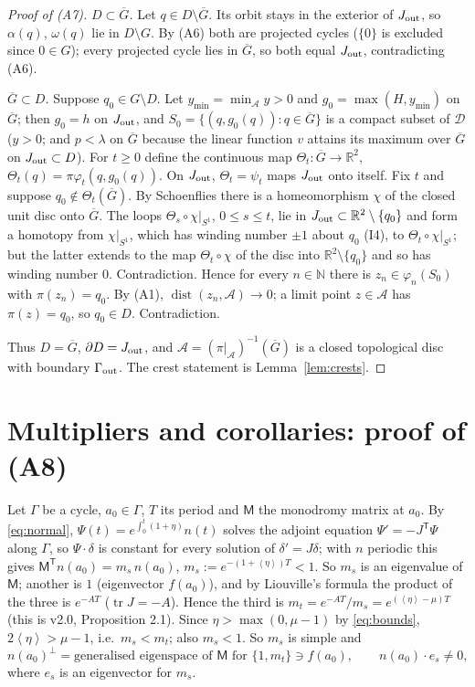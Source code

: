 \documentclass[11pt,a4paper]{article}
\numberwithin{equation}{section}
\theoremstyle{remark}\newtheorem{remark}[theorem]{Remark}
\newcommand{\R}{\mathbb R}
\newcommand{\cA}{\mathcal A}
\newcommand{\cD}{\mathcal D}
\newcommand{\avg}[1]{\left\langle #1\right\rangle}
\begin{document}
\begin{proof}[Proof of (A7)]
\emph{$D\subset\overline G$.} Let $q\in D\setminus\overline G$. Its orbit stays in the exterior of $J_{\rm out}$, so
$\alpha(q)$, $\omega(q)$ lie in $D\setminus G$. By (A6) both are projected cycles ($\{0\}$ is excluded since
$0\in G$); every projected cycle lies in $\overline G$, so both equal $J_{\rm out}$, contradicting (A6).

\emph{$\overline G\subset D$.} Suppose $q_0\in G\setminus D$. Let $y_{\min}=\min_\cA y>0$ and
$g_0=\max(H,y_{\min})$ on $\overline G$; then $g_0=h$ on $J_{\rm out}$, and
$S_0=\{(q,g_0(q)):q\in\overline G\}$ is a compact subset of $\cD$ ($y>0$; and $p<\lambda$ on $\overline G$ because
the linear function $v$ attains its maximum over $\overline G$ on $J_{\rm out}\subset D$). For $t\ge0$ define the
continuous map $\Theta_t:\overline G\to\R^2$, $\Theta_t(q)=\pi\varphi_t(q,g_0(q))$. On $J_{\rm out}$,
$\Theta_t=\psi_t$ maps $J_{\rm out}$ onto itself. Fix $t$ and suppose $q_0\notin\Theta_t(\overline G)$. By
Schoenflies there is a homeomorphism $\chi$ of the closed unit disc onto $\overline G$. The loops
$\Theta_s\circ\chi|_{S^1}$, $0\le s\le t$, lie in $J_{\rm out}\subset\R^2\setminus\{q_0\}$ and form a homotopy from
$\chi|_{S^1}$, which has winding number $\pm1$ about $q_0$ (I4), to $\Theta_t\circ\chi|_{S^1}$; but the latter
extends to the map $\Theta_t\circ\chi$ of the disc into $\R^2\setminus\{q_0\}$ and so has winding number $0$.
Contradiction. Hence for every $n\in\mathbb N$ there is $z_n\in\varphi_n(S_0)$ with $\pi(z_n)=q_0$. By (A1),
$\operatorname{dist}(z_n,\cA)\to0$; a limit point $z\in\cA$ has $\pi(z)=q_0$, so $q_0\in D$. Contradiction.

Thus $D=\overline G$, $\partial D=J_{\rm out}$, and $\cA=(\pi|_\cA)^{-1}(\overline G)$ is a closed topological disc
with boundary $\Gamma_{\rm out}$. The crest statement is Lemma~\ref{lem:crests}.
\end{proof}

\section{Multipliers and corollaries: proof of (A8)}\label{sec:mult}
Let $\Gamma$ be a cycle, $a_0\in\Gamma$, $T$ its period and $\mathsf M$ the monodromy matrix at $a_0$. By
\eqref{eq:normal}, $\Psi(t)=e^{\int_0^t(1+\eta)}n(t)$ solves the adjoint equation $\Psi'=-J^{\mathsf T}\Psi$ along
$\Gamma$, so $\Psi\cdot\delta$ is constant for every solution of $\delta'=J\delta$; with $n$ periodic this gives
$\mathsf M^{\mathsf T}n(a_0)=m_s\,n(a_0)$, $m_s:=e^{-(1+\avg\eta)T}<1$. So $m_s$ is an eigenvalue of $\mathsf M$; another
is $1$ (eigenvector $f(a_0)$), and by Liouville's formula the product of the three is $e^{-AT}$ ($\operatorname{tr}J=-A$).
Hence the third is $m_t=e^{-AT}/m_s=e^{(\avg\eta-\mu)T}$ (this is v2.0, Proposition 2.1). Since
$\eta>\max(0,\mu-1)$ by \eqref{eq:bounds}, $2\avg\eta>\mu-1$, i.e.\ $m_s<m_t$; also $m_s<1$. So $m_s$ is simple and
\begin{equation}\label{eq:nperp}
n(a_0)^\perp=\text{generalised eigenspace of }\mathsf M\text{ for }\{1,m_t\}\ni f(a_0),\qquad n(a_0)\cdot e_s\ne0,
\end{equation}
where $e_s$ is an eigenvector for $m_s$.
\end{document}
